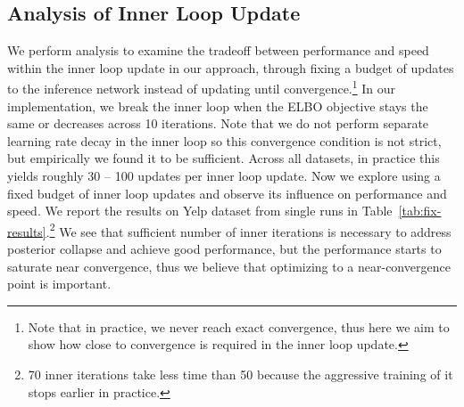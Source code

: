 \documentclass{article} \usepackage{iclr2019_conference,times}
\begin{document}
\begin{table}[!t]
    \centering
    \caption{Results on Yelp dataset using a fixed budget of inner encoder updates}
    \label{tab:fix-results}
\end{table}

\subsection{Analysis of Inner Loop Update}
We perform analysis to examine the tradeoff between performance and speed within the inner loop update in our approach, through fixing a budget of updates to the inference network instead of updating until convergence.\footnote{Note that in practice, we never reach exact convergence, thus here we aim to show how close to convergence is required in the inner loop update.} In our implementation, we break the inner loop when the ELBO objective stays the same or decreases across 10 iterations. Note that we do not perform separate learning rate decay in the inner loop so this convergence condition is not strict, but empirically we found it to be sufficient. Across all datasets, in practice this yields roughly 30 -- 100 updates per inner loop update. Now we explore using a fixed budget of inner loop updates and observe its influence on performance and speed. We report the results on Yelp dataset from single runs in Table~\ref{tab:fix-results}.\footnote{70 inner iterations take less time than 50 because the aggressive training of it stops earlier in practice.} We see that sufficient number of inner iterations is necessary to address posterior collapse and achieve good performance, but the performance starts to saturate near convergence, thus we believe that optimizing to a near-convergence point is important.
\end{document}
